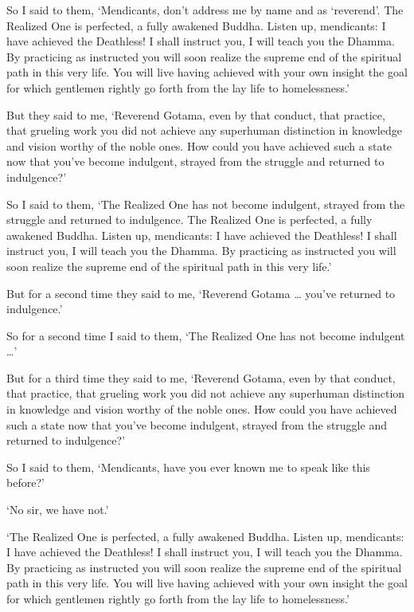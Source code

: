 \documentclass[12pt,openany]{book}%
\begin{document}
So I said to them, ‘Mendicants, don’t address me by name and as ‘reverend’. The Realized One is perfected, a fully awakened Buddha. Listen up, mendicants: I have achieved the Deathless! I shall instruct you, I will teach you the Dhamma. By practicing as instructed you will soon realize the supreme end of the spiritual path in this very life. You will live having achieved with your own insight the goal for which gentlemen rightly go forth from the lay life to homelessness.’ 

But they said to me, ‘Reverend Gotama, even by that conduct, that practice, that grueling work you did not achieve any superhuman distinction in knowledge and vision worthy of the noble ones. How could you have achieved such a state now that you’ve become indulgent, strayed from the struggle and returned to indulgence?’ 

So I said to them, ‘The Realized One has not become indulgent, strayed from the struggle and returned to indulgence. The Realized One is perfected, a fully awakened Buddha. Listen up, mendicants: I have achieved the Deathless! I shall instruct you, I will teach you the Dhamma. By practicing as instructed you will soon realize the supreme end of the spiritual path in this very life.’ 

But for a second time they said to me, ‘Reverend Gotama … you’ve returned to indulgence.’ 

So for a second time I said to them, ‘The Realized One has not become indulgent …’ 

But for a third time they said to me, ‘Reverend Gotama, even by that conduct, that practice, that grueling work you did not achieve any superhuman distinction in knowledge and vision worthy of the noble ones. How could you have achieved such a state now that you’ve become indulgent, strayed from the struggle and returned to indulgence?’ 

So I said to them, ‘Mendicants, have you ever known me to speak like this before?’ 

‘No sir, we have not.’ 

‘The Realized One is perfected, a fully awakened Buddha. Listen up, mendicants: I have achieved the Deathless! I shall instruct you, I will teach you the Dhamma. By practicing as instructed you will soon realize the supreme end of the spiritual path in this very life. You will live having achieved with your own insight the goal for which gentlemen rightly go forth from the lay life to homelessness.’ 
\end{document}
